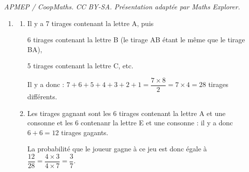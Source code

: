 \documentclass[10pt]{article}
\begin{document}
\noindent\textit{APMEP / CoopMaths. CC BY-SA. Présentation adaptée par Maths Explorer.}\par\medskip
\medskip









\begin{enumerate}
\item 
	\begin{enumerate}
		\item 
Il y a 7 tirages contenant la lettre A, puis 

6 tirages contenant la lettre B (le tirage AB étant le même que le tirage BA), 

5 tirages contenant la lettre C, etc.

Il y a donc : $7 + 6 + 5 + 4 + 3 + 2 + 1 = \dfrac{7 \times 8}{2}= 7 \times 4 = 28$ tirages différents.
		\item 
Les tirages gagnant sont les 6 tirages contenant la lettre A et une consonne et les 6 contenanr la lettre E et une consonne : il y a donc $6 + 6 = 12$ tirages gagants.

La probabilité que le joueur gagne à ce jeu est donc égale à $\dfrac{12}{28} = \dfrac{4\times 3}{4 \times 7} = \dfrac{3}{7}$.
	\end{enumerate}
\end{enumerate}
	
\end{document}
